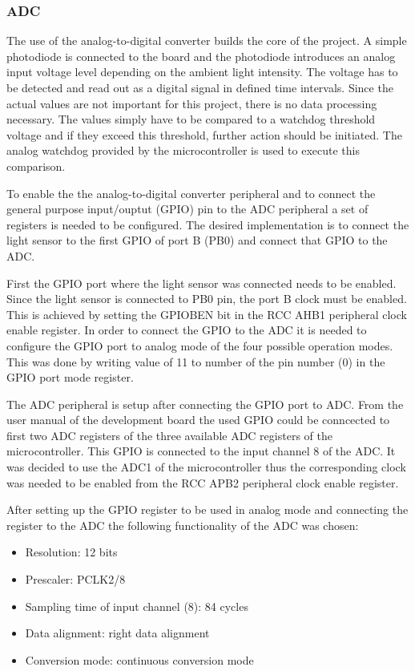 \subsubsection{ADC}
The use of the analog-to-digital converter builds the core of the project. A simple photodiode is connected to the board and the photodiode introduces an analog input voltage level depending on the ambient light intensity. The voltage has to be detected and read out as a digital signal in defined time intervals. Since the actual values are not important for this project, there is no data processing necessary. The values simply have to be compared to a watchdog threshold voltage and if they exceed this threshold, further action should be initiated. The analog watchdog provided by the microcontroller is used to execute this comparison.\\
\par
To enable the the analog-to-digital converter peripheral and to connect the general purpose input/ouptut (GPIO) pin to the ADC peripheral a set of registers is needed to be configured. The desired implementation is to connect the light sensor to the first GPIO of port B (PB0) and connect that GPIO to the ADC.\\
\par
First the GPIO port where the light sensor was connected needs to be enabled. Since the light sensor is connected to PB0 pin, the port B clock must be enabled. This is achieved by setting the GPIOBEN bit in the RCC AHB1 peripheral clock enable register. In order to connect the GPIO to the ADC it is needed to configure the GPIO port to analog mode of the four possible operation modes. This was done by writing value of 11 to number of the pin number (0) in the GPIO port mode register.\\
\par
The ADC peripheral is setup after connecting the GPIO port to ADC. From the user manual of the development board \cite{UsrManual} the used GPIO could be conncected to first two ADC registers of the three available ADC registers of the microcontroller. This GPIO is connected to the input channel 8 of the ADC. It was decided to use the ADC1 of the microcontroller thus the corresponding clock was needed to be enabled from the RCC APB2 peripheral clock enable register.\\
\par
After setting up the GPIO register to be used in analog mode and connecting the register to the ADC the following functionality of the ADC was chosen:
\begin{itemize}
  \item Resolution: 12 bits
  \item Prescaler: PCLK2/8
  \item Sampling time of input channel (8): 84 cycles
  \item Data alignment: right data alignment
  \item Conversion mode: continuous conversion mode
\end{itemize}
